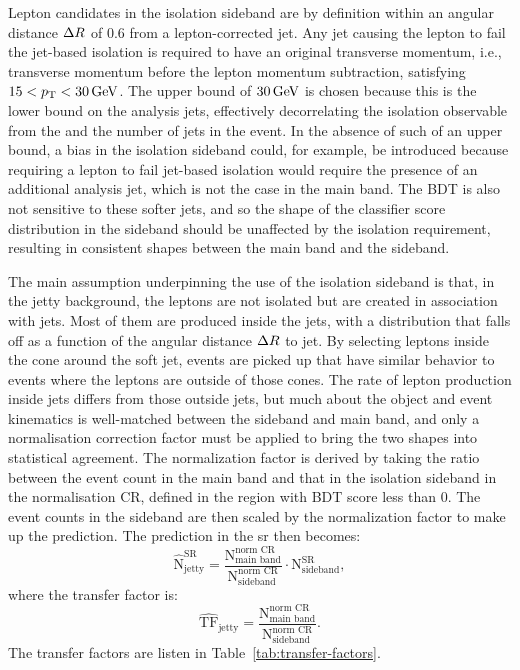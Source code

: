 Lepton candidates in the isolation sideband are by definition within an angular distance $\Delta R$ of 0.6 from a lepton-corrected jet. Any jet causing the lepton to fail the jet-based isolation is required to have an original transverse momentum, i.e., transverse momentum before the lepton momentum subtraction, satisfying $15<p_{\mathrm{T}}<30\,\text{Ge\hspace{-.08em}V}$. The upper bound of $30\,\text{Ge\hspace{-.08em}V}$ is chosen because this is the lower bound on the analysis jets, effectively decorrelating the isolation observable from the \mht and the number of jets in the event. In the absence of such of an upper bound, a bias in the isolation sideband could, for example, be introduced because requiring a lepton to fail jet-based isolation would require the presence of an additional analysis jet, which is not the case in the main band. The BDT is also not sensitive to these softer jets, and so the shape of the classifier score distribution in the sideband should be unaffected by the isolation requirement, resulting in consistent shapes between the main band and the sideband.

The main assumption underpinning the use of the isolation sideband is that, in the jetty background, the leptons are not isolated but are created in association with jets. Most of them are produced inside the jets, with a distribution that falls off as a function of the angular distance $\Delta R$ to jet. By selecting leptons inside the cone around the soft jet, events are picked up that have similar behavior to events where the leptons are outside of those cones. The rate of lepton production inside jets differs from those outside jets, but much about the object and event kinematics is well-matched between the sideband and main band, and only a normalisation correction factor must be applied to bring the two shapes into statistical agreement. The normalization factor is derived by taking the ratio between the event count in the main band and that in the isolation sideband in the normalisation CR, defined in the region with BDT score less than 0. The event counts in the sideband are then scaled by the normalization factor to make up the prediction. The prediction in the \gls{sr} then becomes:
\begin{equation}
\hat{\mathrm{N}}^{\mathrm{SR}}_{\text{jetty}} = \frac{\mathrm{N}^{\text{norm CR}}_{\text{main band}}}{\mathrm{N}^{\text{norm CR}}_{\text{sideband}}} \cdot\mathrm{N}^{\mathrm{SR}}_{\text{sideband}},
\end{equation}
where the transfer factor is:
\begin{equation}
\hat{\mathrm{TF}}_{\text{jetty}} = \frac{\mathrm{N}^{\text{norm CR}}_{\text{main band}}}{\mathrm{N}^{\text{norm CR}}_{\text{sideband}}}.
\end{equation}
The transfer factors are listen in Table~\ref{tab:transfer-factors}.


